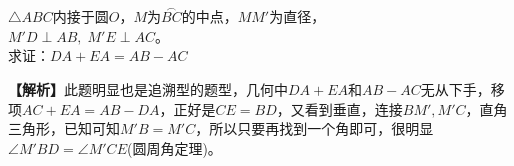 \documentclass[../main.tex]{subfiles}
\begin{document}
\begin{exercise}
  \begin{minipage}{0.3\textwidth}
    \centering
  \end{minipage}
  \begin{minipage}{0.7\textwidth}
    $\triangle ABC$内接于圆$O$，$M$为$\overset{\frown}{BC}$的中点，$MM'$为直径，\\
    $M'D\perp AB, \; M'E\perp AC$。\\求证：$DA+EA=AB-AC$
  \end{minipage}
\end{exercise}
\begin{solution}
  \textbf{【解析】}此题明显也是追溯型的题型，几何中$DA+EA$和$AB-AC$无从下手，移项$AC+EA=AB-DA$，正好是$CE=BD$，又看到垂直，连接$BM',M'C$，直角三角形，已知可知$M'B=M'C$，所以只要再找到一个角即可，很明显$\angle M'BD = \angle M'CE$(圆周角定理)。
\end{solution}

\hrulefill
\end{document}
